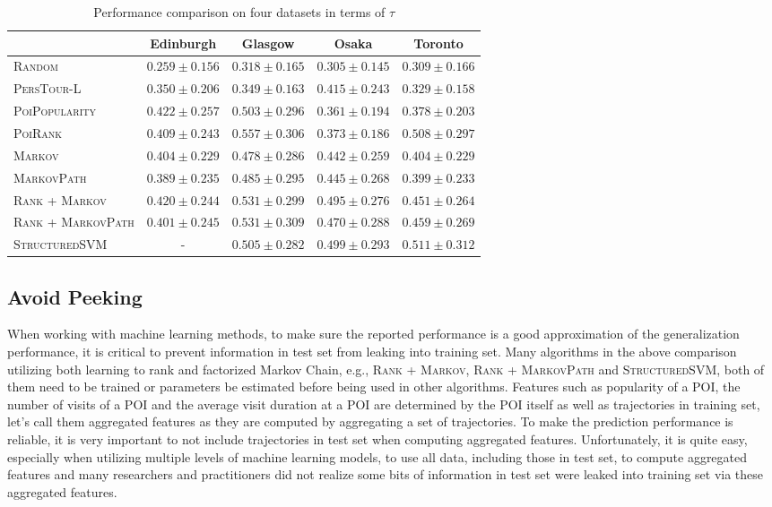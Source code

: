 \begin{table*}
\centering
\begin{tabular}{l|cccc} \hline
 & Edinburgh & Glasgow & Osaka & Toronto \\ \hline
\textsc{Random} & $0.259\pm0.156$ & $0.318\pm0.165$ & $0.305\pm0.145$ & $0.309\pm0.166$ \\
\textsc{PersTour-L} & $0.350\pm0.206$ & $0.349\pm0.163$ & $0.415\pm0.243$ & $0.329\pm0.158$ \\
\textsc{PoiPopularity} & $\mathbf{0.422\pm0.257}$ & $0.503\pm0.296$ & $0.361\pm0.194$ & $0.378\pm0.203$ \\
\textsc{PoiRank} & $0.409\pm0.243$ & $\mathbf{0.557\pm0.306}$ & $0.373\pm0.186$ & $0.508\pm0.297$ \\
\textsc{Markov} & $0.404\pm0.229$ & $0.478\pm0.286$ & $0.442\pm0.259$ & $0.404\pm0.229$ \\
\textsc{MarkovPath} & $0.389\pm0.235$ & $0.485\pm0.295$ & $0.445\pm0.268$ & $0.399\pm0.233$ \\
\textsc{Rank} + \textsc{Markov} & $0.420\pm0.244$ & $0.531\pm0.299$ & $0.495\pm0.276$ & $0.451\pm0.264$ \\
\textsc{Rank} + \textsc{MarkovPath} & $0.401\pm0.245$ & $0.531\pm0.309$ & $0.470\pm0.288$ & $0.459\pm0.269$ \\
\textsc{StructuredSVM} & - & $0.505\pm0.282$ & $\mathbf{0.499\pm0.293}$ & $\mathbf{0.511\pm0.312}$ \\
\hline
\end{tabular}
\caption{Performance comparison on four datasets in terms of $\tau$}
\label{table:tau}
\end{table*}


\subsection{Avoid Peeking}
When working with machine learning methods, to make sure the reported performance is a good approximation
of the generalization performance, it is critical to prevent information in test set from leaking into
training set.
Many algorithms in the above comparison utilizing both learning to rank and factorized Markov Chain, 
e.g., \textsc{Rank} + \textsc{Markov}, \textsc{Rank} + \textsc{MarkovPath} and \textsc{StructuredSVM},
both of them need to be trained or parameters be estimated before being used in other algorithms.
Features such as popularity of a POI, the number of visits of a POI and the average visit duration at a POI are
determined by the POI itself as well as trajectories in training set, let's call them aggregated features as they are 
computed by aggregating a set of trajectories.
To make the prediction performance is reliable, it is very important to not include trajectories in test set 
when computing aggregated features.
Unfortunately, it is quite easy, especially when utilizing multiple levels of machine learning models,
to use all data, including those in test set, to compute aggregated features and many researchers and 
practitioners did not realize some bits of information in test set were leaked into training set via these aggregated features.

